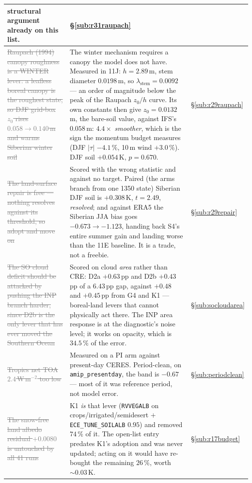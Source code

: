\documentclass[10pt]{article}
\newcommand{\dead}[1]{\textcolor{gray}{\sout{#1}}}
\begin{document}
\begin{center}
\begin{tabular}{p{} p{} l}
structural argument already on this list. &
\S\ref{sub:r31raupach} \\
\midrule
\dead{Raupach (1994) canopy roughness is a WINTER lever: a leafless boreal canopy is the
roughest state, so DJF grid-box $z_0$ rises $0.058\to0.140$\,m and warms Siberian winter
soil} &
The winter mechanism requires a canopy the model does not have. Measured in 11J:
$h=2.89$\,m, stem diameter $0.0198$\,m, so $\lambda_{\text{stem}}=0.0092$ --- an order of
magnitude below the peak of the Raupach $z_0/h$ curve. Its own constants then give
$z_0=0.0132$\,m, the bare-soil value, against IFS's $0.058$\,m: $4.4\times$
\emph{smoother}, which is the sign the momentum budget measures (DJF $|\tau|$ $-4.1\,\%$,
10\,m wind $+3.0\,\%$). DJF soil $+0.054$\,K, $p=0.670$. & \S\ref{sub:r29raupach} \\
\dead{The land-surface repair is free --- nothing resolves against its threshold, so adopt
and move on} &
Scored with the wrong statistic and against no target. Paired (the arms branch from one
1350 state) Siberian DJF soil is $+0.308$\,K, $t=2.49$, \emph{resolved}; and against ERA5
the Siberian JJA bias goes $-0.673\to-1.123$, handing back S4's entire summer gain and
landing worse than the 11E baseline. It is a trade, not a freebie. & \S\ref{sub:r29repair} \\
\dead{The SO cloud deficit should be attacked by pushing the INP branch harder, since D2b
is the only lever that has ever moved the Southern Ocean} &
Scored on cloud \emph{area} rather than CRE: D2a $+0.63$\,pp and D2b $+0.43$\,pp of a
$6.43$\,pp gap, against $+0.48$ and $+0.45$\,pp from G4 and K1 --- boreal-land levers that
cannot physically act there. The INP area response is at the diagnostic's noise level; it
works on opacity, which is $34.5\,\%$ of the error. & \S\ref{sub:socloudarea} \\
\dead{Tropics net TOA $2.4$\,W\,m$^{-2}$ too low} &
Measured on a PI arm against present-day CERES. Period-clean, on \texttt{amip\_presentday},
the band is $-0.67$ --- most of it was reference period, not model error. &
\S\ref{sub:periodclean} \\
\dead{The snow-free land albedo residual $+0.0080$ is untouched by all 41 runs} &
K1 \emph{is} that lever (\texttt{RVVEGALB} on crops/irrigated/semidesert $+$
\texttt{ECE\_TUNE\_SOILALB} $0.95$) and removed $74\,\%$ of it. The open-list entry
predates K1's adoption and was never updated; acting on it would have re-bought the
remaining $26\,\%$, worth ${\sim}0.03$\,K. & \S\ref{sub:r17budget} \\

\end{tabular}
\end{center}
\end{document}
